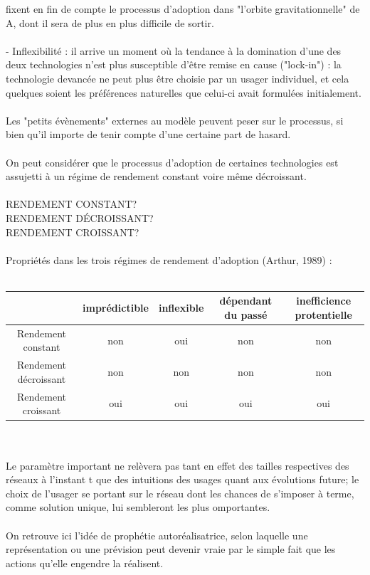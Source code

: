 \documentclass[a4paper, 10pt]{article}
\begin{document}
fixent en fin de compte le processus d'adoption dans "l'orbite gravitationnelle" de A, dont il sera de plus en plus difficile de sortir.\\ \\
- Inflexibilité : il arrive un moment où la tendance à la domination d'une des deux technologies
n'est plus susceptible d'être remise en cause ("lock-in") :
la technologie devancée ne peut plus être choisie par un usager individuel,
et cela quelques soient les préférences naturelles que celui-ci avait formulées initialement.\\ \\
Les "petits évènements" externes au modèle peuvent peser sur le processus,
si bien qu'il importe de tenir compte d'une certaine part de hasard.\\ \\
On peut considérer que le processus d'adoption de certaines technologies est assujetti à
un régime de rendement constant voire même décroissant.\\ \\
RENDEMENT CONSTANT?\\
RENDEMENT DÉCROISSANT?\\
RENDEMENT CROISSANT?\\ \\
Propriétés dans les trois régimes de rendement d'adoption (Arthur, 1989) :\\ \\
\begin{tabular}{|c|c|c|c|c|}
\hline
& imprédictible & inflexible & dépendant du passé & inefficience protentielle \\
\hline
Rendement constant & non & oui & non & non\\
\hline
Rendement décroissant & non & non & non & non\\
\hline
Rendement croissant & oui & oui & oui & oui\\
\hline
\end{tabular}\\ \\
Le paramètre important ne relèvera pas tant en effet des tailles respectives des réseaux à l'instant t
que des intuitions des usages quant aux évolutions future;
le choix de l'usager se portant sur le réseau dont les chances de s'imposer à terme,
comme solution unique, lui sembleront les plus omportantes.\\ \\
On retrouve ici l'idée de prophétie autoréalisatrice,
selon laquelle une représentation ou une prévision peut devenir vraie par le simple fait que les actions qu'elle engendre la réalisent.\\ \\
\end{document}
